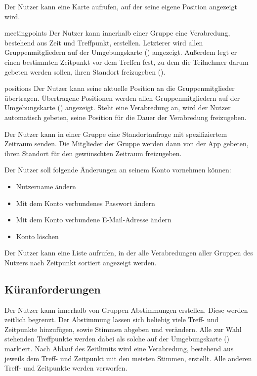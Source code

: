 \documentclass[parskip=full,11pt]{scrartcl}
\begin{document}
%
Der Nutzer kann eine Karte aufrufen, auf der seine eigene Position angezeigt
wird.

    {meetingpoints}
%
Der Nutzer kann innerhalb einer Gruppe eine Verabredung, bestehend aus
Zeit und Treffpunkt, erstellen. Letzterer wird allen Gruppenmitgliedern auf der
Umgebungskarte () angezeigt.
Außerdem legt er einen bestimmten Zeitpunkt vor dem Treffen fest,
zu dem die Teilnehmer darum gebeten werden sollen,
ihren Standort freizugeben ().

    {positions}
%
Der Nutzer kann seine aktuelle Position an die Gruppenmitglieder übertragen.
Übertragene Positionen werden allen Gruppenmitgliedern auf der Umgebungskarte
() angezeigt.
Steht eine Verabredung an, wird der Nutzer automatisch gebeten, seine Position
für die Dauer der Verabredung freizugeben.

%
Der Nutzer kann in einer Gruppe eine Standortanfrage mit spezifiziertem
Zeitraum senden.
Die Mitglieder der Gruppe werden dann von der App gebeten,
ihren Standort für den gewünschten Zeitraum freizugeben.

%
Der Nutzer soll folgende Änderungen an seinem Konto vornehmen können:
\begin{itemize}
		\item Nutzername ändern
    \item Mit dem Konto verbundenes Passwort ändern
    \item Mit dem Konto verbundene E-Mail-Adresse ändern
    \item Konto löschen
\end{itemize}

%
%
Der Nutzer kann eine Liste aufrufen, in der alle Verabredungen aller Gruppen
des Nutzers nach Zeitpunkt sortiert angezeigt werden.

\subsection{Küranforderungen}

%
Der Nutzer kann innerhalb von Gruppen Abstimmungen erstellen.
Diese werden zeitlich begrenzt.
Der Abstimmung lassen sich beliebig viele Treff- und Zeitpunkte hinzufügen,
sowie Stimmen abgeben und verändern.
Alle zur Wahl stehenden Treffpunkte werden dabei als solche auf der
Umgebungskarte () markiert.
Nach Ablauf des Zeitlimits wird eine Verabredung, bestehend aus jeweils dem
Treff- und Zeitpunkt mit den meisten Stimmen, erstellt.
Alle anderen Treff- und Zeitpunkte werden verworfen.
\end{document}
